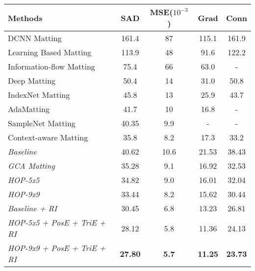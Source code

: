 \begin{table}[t]
	\setlength{\tabcolsep}{8pt}
	\centering
	\begin{tabular}{l|cccc}  
		\toprule
		Methods & SAD & MSE($10^{-3}$) & Grad &Conn\\
		\midrule
		DCNN Matting\cite{cho2019deep}& 161.4& 87 &115.1& 161.9 \\
		Learning Based Matting \cite{zheng2009learning}&113.9& 48 &91.6 &122.2\\ 
		Information-flow Matting\cite{aksoy2017designing} & 75.4& 66& 63.0&-\\
		Deep Matting\cite{xu2017deep} &50.4& 14& 31.0& 50.8\\
		IndexNet Matting\cite{lu2019indices} &45.8&	13&	25.9&	43.7\\	
		AdaMatting\cite{cai2019disentangled}&41.7&10  &16.8 &-\\
		SampleNet Matting\cite{samplenet} &40.35&	9.9&	-&	-\\	
		Context-aware Matting\cite{hou2019context}& 35.8 & 8.2& 17.3& 33.2\\
		\midrule
		\textit{Baseline}  & 40.62 & 10.6 & 21.53 & 38.43\\
		\textit{GCA Matting} &35.28&	9.1&	16.92&	32.53\\
		\textit{HOP-5x5}& 34.82& 9.0 & 16.01& 32.04\\
		
		\textit{HOP-9x9}& {33.44}&{8.2}& {15.62}&{30.44} \\
		\textit{Baseline + RI}& 30.45& 6.8 & 13.23& 26.81\\
		\textit{HOP-5x5 + PosE + TriE + RI} & {28.12}& {5.8} & {11.36}& {24.13}\\
		\textit{HOP-9x9 + PosE + TriE + RI}& \textbf{27.80}& \textbf{5.7} & \textbf{11.25}& \textbf{23.73}\\
		\bottomrule
	\end{tabular}
	\label{tab5:adobe}
\end{table}
	

